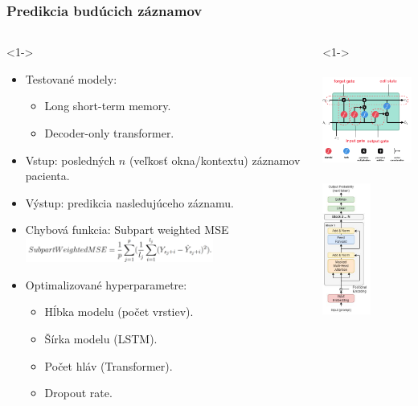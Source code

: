 \documentclass[slovak,10pt]{beamer}
\begin{document}
\begin{frame}
	\frametitle{Predikcia budúcich záznamov}
	
	\begin{columns}[T]%
		\begin{column}{.56\textwidth}<1->%
			\begin{itemize}
				\vspace{0.2cm}
				\item<1> Testované modely:
				\begin{itemize}
					\item<1> Long short-term memory.
					\item<1> Decoder-only transformer.
				\end{itemize}
				\item<1> Vstup: posledných $n$ (veľkosť okna/kontextu) záznamov pacienta.
				\item<1> Výstup: predikcia nasledujúceho záznamu.
				\item<1> Chybová funkcia: Subpart weighted MSE\\
				\includegraphics[height=0.8cm]{images/swMSE.png}
				\item<1> Optimalizované hyperparametre: 
				\begin{itemize}
					\item<1> Hĺbka modelu (počet vrstiev).
					\item<1> Šírka modelu (LSTM).
					\item<1> Počet hláv (Transformer).
					\item<1> Dropout rate.
				\end{itemize}
			\end{itemize}
		\end{column}
		\hfill%
		\begin{column}{.42\textwidth}<1->%
			\begin{center}
				\includegraphics[height=3.2cm]{images/LSTM_arch.png}
			\end{center}
			\begin{center}
				\includegraphics[height=4.3cm]{images/decod_only_trans_arch.png}
			\end{center}
		\end{column}  
	\end{columns}
\end{frame}
\end{document}
